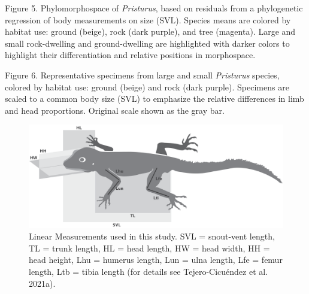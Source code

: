 \documentclass[
  11pt,
]{article}
\begin{document}
Figure 5. Phylomorphospace of \emph{Pristurus}, based on residuals from
a phylogenetic regression of body measurements on size (SVL). Species
means are colored by habitat use: ground (beige), rock (dark purple),
and tree (magenta). Large and small rock-dwelling and ground-dwelling
are highlighted with darker colors to highlight their differentiation
and relative positions in morphospace.

Figure 6. Representative specimens from large and small
\textit{Pristurus} species, colored by habitat use: ground (beige) and
rock (dark purple). Specimens are scaled to a common body size (SVL) to
emphasize the relative differences in limb and head proportions.
Original scale shown as the gray bar.

\newpage

\begin{figure}

{\centering \includegraphics[width=1\linewidth]{Figs/Fig1} 

}

\caption{Linear Measurements used in this study. SVL = snout-vent length, TL = trunk length, HL = head length, HW = head width, HH = head height, Lhu = humerus length, Lun = ulna length, Lfe = femur length, Ltb = tibia length (for details see Tejero-Cicu{\'{e}}ndez et al. 2021a).}\label{fig:unnamed-chunk-4}
\end{figure}

\newpage
\end{document}
